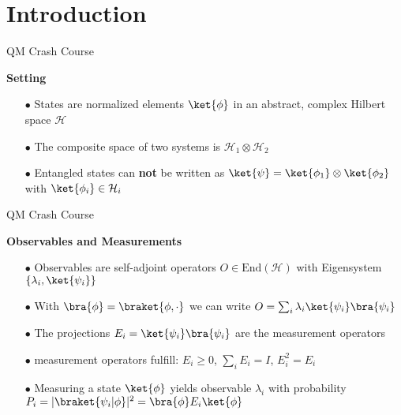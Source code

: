 \documentclass[13.5pt]{beamer}
\begin{document}
\section{Introduction}
\begin{frame}{QM Crash Course}
\begin{block}{\color{colorblue}\textbf{Setting}}
\begin{itemize}
\item[$\bullet$] States are normalized elements $\ket{\phi}$ in an abstract, complex Hilbert space $\mathcal{H}$ \pause
\item[$\bullet$] The composite space of two systems is $\mathcal{H}_1 \otimes \mathcal{H}_2$
\end{itemize}
\end{block}

\centering
   \pause
\begin{itemize}
\item[$\bullet$] Entangled states can \textbf{not} be written as $\ket{\psi} = \ket{\phi_1} \otimes \ket{\phi_2}$ with $\ket{\phi_i} \in \mathcal{H}_i$ 
\end{itemize}
\end{frame}

\begin{frame} {QM Crash Course}
\begin{block}{\color{colorblue}\textbf{Observables and Measurements}}
\begin{itemize}
\item[$\bullet$] Observables are self-adjoint operators  $O \in \mathrm{End}(\mathcal{H})$ with Eigensystem $\{ \lambda_i, \ket{\psi_i} \}$ \pause
\item[$\bullet$] With $\bra{\phi} = \braket{\phi , \cdot}$ we can write $O = \sum_i  \lambda_i \ket{\psi_i}\bra{\psi_i}$ 
\item[$\bullet$] The projections $E_i = \ket{\psi_i}\bra{\psi_i}$ are the measurement operators \pause
\item[$\bullet$] measurement operators fulfill: $E_i \geq 0$, $\sum_i E_i = I$, $E_i^2=E_i$ \pause
\item[$\bullet$] Measuring a state $\ket{\phi}$ yields observable $\lambda_i$ with probability $P_i = |\braket{\psi_i | \phi}|^2 = \bra{\phi} E_i \ket{\phi}$
\end{itemize} 
\end{block}
\end{frame}
\end{document}
